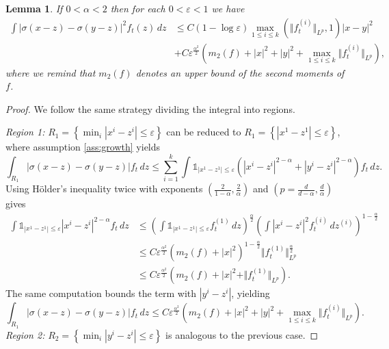 \documentclass[10pt,oneside]{amsart}
\numberwithin{equation}{section}
\numberwithin{definition}{section}
\numberwithin{theorem}{section}
\newtheorem{lemma}{Lemma}
\numberwithin{lemma}{section}
\begin{document}
% 
\begin{lemma}\label{lem:sigma_est_mod_soft}
  If $0<\alpha <2$ then for each $0<\varepsilon<1$ we have
  \begin{align*}
    \int\left|\sigma(x-z)-\sigma(y-z)\right|^{2}f_{t}(z)\,dz
    &\leq C(1-\log\varepsilon)\max_{1\leq i\leq k}(\Vert f_{t}^{(i)}\Vert_{L^{p}},1)|x-y|^{2}\\
    &+C\varepsilon^{\frac{\alpha^{2}}{2}}\left(m_{2}(f)+|x|^{2}+|y|^{2}+\max_{1\leq i\leq k}\Vert f_{t}^{(i)}\Vert_{L^{p}}\right),
  \end{align*}
  where we remind that $m_2(f)$ denotes an upper bound of the second moments of $f$.
\end{lemma}
% 
\begin{proof}
  We follow the same strategy dividing the integral into regions.

  \textit{Region 1:} $R_{1}=\left\{ \min_{i}|x^{i}-z^{i}|\leq\varepsilon\right\}$ can be reduced to $R_{1}=\left\{ |x^{1}-z^{1}|\leq\varepsilon\right\}$, where assumption \ref{ass:growth} yields
  \begin{equation*}
    \int_{R_{1}}\left|\sigma(x-z)-\sigma(y-z)\right|f_{t}\,dz\leq\sum_{i=1}^{k}\int\mathds{1}_{|x^{1}-z^{1}|\leq\varepsilon}\left(|x^{i}-z^{i}|^{2-\alpha}+|y^{i}-z^{i}|^{2-\alpha}\right)f_{t}\,dz.
  \end{equation*}
  Using Hölder's inequality twice with exponents $\left(\frac{2}{1-\alpha},\frac{2}{\alpha}\right)$ and $\left(p=\frac{d}{d-\alpha},\frac{d}{\alpha}\right)$ gives
  \begin{align*}
    \int\mathds{1}_{|x^{1}-z^{1}|\leq\varepsilon}|x^{i}-z^{i}|^{2-\alpha}f_{t}\,dz&
    \leq\left(\int\mathds{1}_{|x^{1}-z^{1}|\leq\varepsilon}f_{t}^{(1)}\,dz\right)^{\frac{\alpha}{2}}\left(\int|x^{i}-z^{i}|^{2}f^{(i)}_t\,dz^{(i)}\right)^{1-\frac{\alpha}{2}}\\
    &\leq C\varepsilon^{\frac{\alpha^{2}}{2}}\left(m_{2}(f)+|x|^{2}\right)^{1-\frac{\alpha}{2}}\Vert f_{t}^{(1)}\Vert_{L^{p}}^{\frac{\alpha}{2}}\\
    &\leq C\varepsilon^{\frac{\alpha^{2}}{2}}\left(m_{2}(f)+|x|^{2}+\Vert f_{t}^{(1)}\Vert_{L^{p}}\right).
  \end{align*}
  The same computation bounds the term with $|y^i-z^i|$, yielding
  \begin{equation*}
    \int_{R_{1}}\left|\sigma(x-z)-\sigma(y-z)\right|f_{t}\,dz\leq C\varepsilon^{\frac{\alpha^{2}}{2}}\left(m_{2}(f)+|x|^{2}+|y|^{2}+\max_{1\leq i\leq k}\Vert f_{t}^{(i)}\Vert_{L^{p}}\right).
  \end{equation*}
  \textit{Region 2:} $R_{2}=\left\{ \min_{i}|y^{i}-z^{i}|\leq\varepsilon\right\} $ is analogous to the previous case.


\end{proof}
\end{document}
